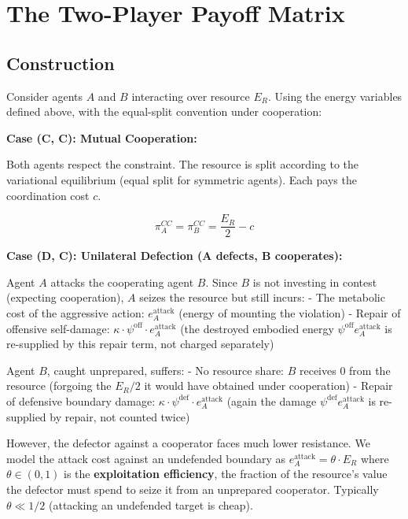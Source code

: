 \documentclass[11pt]{article}
\theoremstyle{plain}
\theoremstyle{definition}
\theoremstyle{remark}
\let\origsection\section
\renewcommand{\section}{\needspace{12\baselineskip}\origsection}
\let\origsubsection\subsection
\renewcommand{\subsection}{\needspace{7\baselineskip}\origsubsection}
\begin{document}
\section{The Two-Player Payoff
Matrix}\label{the-two-player-payoff-matrix}

\subsection{Construction}\label{construction}

Consider agents \(A\) and \(B\) interacting over resource \(E_R\). Using
the energy variables defined above, with the equal-split convention
under cooperation:

\textbf{Case (C, C): Mutual Cooperation:}

Both agents respect the constraint. The resource is split according to
the variational equilibrium (equal split for symmetric agents). Each
pays the coordination cost \(c\).

\[\pi_A^{CC} = \pi_B^{CC} = \frac{E_R}{2} - c\]

\textbf{Case (D, C): Unilateral Defection (A defects, B cooperates):}

Agent \(A\) attacks the cooperating agent \(B\). Since \(B\) is not
investing in contest (expecting cooperation), \(A\) seizes the resource
but still incurs: - The metabolic cost of the aggressive action:
\(e_A^{\text{attack}}\) (energy of mounting the violation) - Repair of
offensive self-damage:
\(\kappa \cdot \psi^{\text{off}} \cdot e_A^{\text{attack}}\) (the
destroyed embodied energy \(\psi^{\text{off}} e_A^{\text{attack}}\) is
re-supplied by this repair term, not charged separately)

Agent \(B\), caught unprepared, suffers: - No resource share: \(B\)
receives \(0\) from the resource (forgoing the \(E_R/2\) it would have
obtained under cooperation) - Repair of defensive boundary damage:
\(\kappa \cdot \psi^{\text{def}} \cdot e_A^{\text{attack}}\) (again the
damage \(\psi^{\text{def}} e_A^{\text{attack}}\) is re-supplied by
repair, not counted twice)

However, the defector against a cooperator faces much lower resistance.
We model the attack cost against an undefended boundary as
\(e_A^{\text{attack}} = \theta \cdot E_R\) where \(\theta \in (0, 1)\)
is the \textbf{exploitation efficiency}, the fraction of the resource's
value the defector must spend to seize it from an unprepared cooperator.
Typically \(\theta \ll 1/2\) (attacking an undefended target is cheap).
\end{document}
